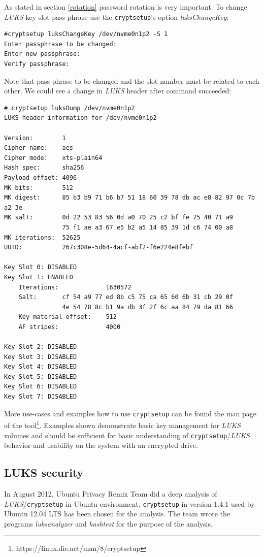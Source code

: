 As stated in section \ref{rotation} password rotation is very important.
To change {\it LUKS} key slot pass-phrase use the {\tt cryptsetup}'s option {\it luksChangeKey}:
\begin{lstlisting}[columns=fixed,basicstyle=\ttfamily\footnotesize,tabsize=4,backgroundcolor=\color{yellow!10}]
#cryptsetup luksChangeKey /dev/nvme0n1p2 -S 1
Enter passphrase to be changed:
Enter new passphrase:
Verify passphrase:
\end{lstlisting}
Note that pass-phrase to be changed and the slot number must be related to each other.
We could see a change in {\it LUKS} header after command succeeded:
\begin{lstlisting}[columns=fixed,basicstyle=\ttfamily\footnotesize,tabsize=4,backgroundcolor=\color{yellow!10}]
# cryptsetup luksDump /dev/nvme0n1p2
LUKS header information for /dev/nvme0n1p2

Version:		1
Cipher name:	aes
Cipher mode:	xts-plain64
Hash spec:		sha256
Payload offset:	4096
MK bits:		512
MK digest:		85 b3 b9 71 b6 b7 51 18 60 39 78 db ac e8 82 97 0c 7b a2 3e
MK salt:		0d 22 53 83 56 0d a0 70 25 c2 bf fe 75 40 71 a9
				75 f1 ae a3 67 e5 b2 a5 14 85 39 1d c6 74 00 a8
MK iterations: 	52625
UUID:			267c308e-5d64-4acf-abf2-f6e224e8febf

Key Slot 0: DISABLED
Key Slot 1: ENABLED
	Iterations:				1630572
	Salt:		cf 54 a9 77 ed 8b c5 75 ca 65 60 6b 31 cb 29 0f
				4e 54 78 8c b1 9a db 3f 2f 6c aa 84 79 da 81 66
	Key material offset:	512
	AF stripes:				4000

Key Slot 2: DISABLED
Key Slot 3: DISABLED
Key Slot 4: DISABLED
Key Slot 5: DISABLED
Key Slot 6: DISABLED
Key Slot 7: DISABLED
\end{lstlisting}
More use-cases and examples how to use {\tt cryptsetup} can be found the man page of the tool\footnote{https://linux.die.net/man/8/cryptsetup}.
Examples shown demonstrate basic key management for {\it LUKS} volumes and should be sufficient for basic understanding of {\tt cryptsetup}/{\it LUKS} behavior and usability on the system with an encrypted drive.



\subsection{LUKS security}

In August 2012, Ubuntu Privacy Remix Team did a deep analysis of {\it LUKS}/{\tt cryptsetup} in Ubuntu environment.
{\tt cryptsetup} in version 1.4.1 used by Ubuntu 12.04 LTS has been chosen for the analysis.
The team wrote the programs {\it luksanalyzer} and {\it hashtest} for the purpose of the analysis.

